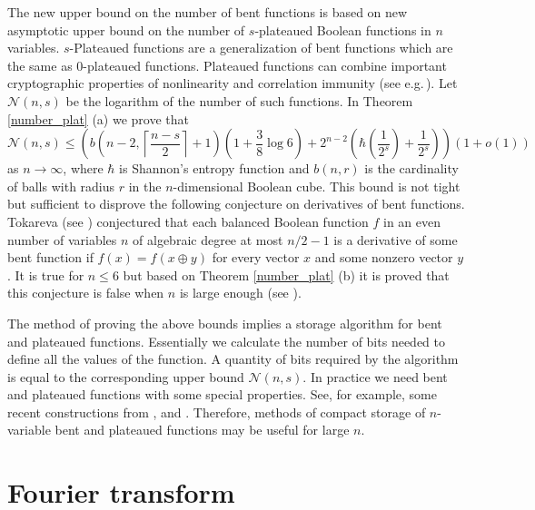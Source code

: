 \documentclass[a4paper,12pt]{article}   %
\begin{document}
The new upper bound on the number of bent functions is based on new
asymptotic  upper bound on the number of $s$-plateaued Boolean
functions in $n$ variables. $s$-Plateaued functions are a
generalization of bent functions which are the same as $0$-plateaued
functions. Plateaued functions can combine important cryptographic
properties of nonlinearity and correlation immunity (see
e.g.\,\cite{Tar}). Let $\mathcal{N}(n,s)$ be the logarithm of the
number of such functions.  In Theorem \ref{number_plat} (a) we prove
that
$$\mathcal{N}(n,s)\leq
\left(b\left(n-2,\left\lceil\frac{n-s}{2}\right\rceil+1\right)\left(1+\frac{3}{8}\log
6\right)+2^{n-2}\left(\hbar\left(\frac{1}{2^s}\right)+\frac{1}{2^s}\right)\right)(1+o(1))$$
as $n\rightarrow\infty$, where $\hbar$ is  Shannon's entropy
function and $b(n,r)$ is the cardinality of balls  with radius $r$
in the $n$-dimensional Boolean cube. This  bound is not tight but
sufficient to disprove the following conjecture on derivatives of
bent functions. Tokareva (see  \cite{Tok16, Shap}) conjectured that
each balanced Boolean function $f$ in an even number of variables
$n$ of algebraic degree at most $n/2 -1$  is a derivative of some
bent function if $f (x) = f (x \oplus y)$ for every vector $x$ and
some nonzero vector $y$. It is true for $n\leq6$
\cite[Theorem~4]{Shap} but based on  Theorem \ref{number_plat} (b)
it is proved  that this conjecture is false when $n$ is large enough
(see \cite{Pot23}).


 The method of proving the above bounds implies a
storage algorithm for bent and plateaued functions. Essentially we
calculate the number of bits needed to define all the values of the
function.
 A quantity of
bits required by the algorithm  is equal to the corresponding upper
bound $\mathcal{N}(n,s)$. In practice we need bent and plateaued
functions with some special properties. See, for example, some
recent constructions from \cite{JL}, \cite{Li} and \cite{Zhang}.
Therefore, methods of compact storage of $n$-variable bent and
plateaued functions may be useful for large $n$.




\section{Fourier transform}
\end{document}
